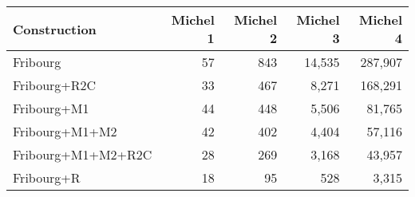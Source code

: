 \begin{tabular}{lrrrr}
  \hline
Construction & Michel 1 & Michel 2 & Michel 3 & Michel 4 \\ 
  \hline
Fribourg & 57 & 843 & 14,535 & 287,907 \\ 
  Fribourg+R2C & 33 & 467 & 8,271 & 168,291 \\ 
  Fribourg+M1 & 44 & 448 & 5,506 & 81,765 \\ 
  Fribourg+M1+M2 & 42 & 402 & 4,404 & 57,116 \\ 
  Fribourg+M1+M2+R2C & 28 & 269 & 3,168 & 43,957 \\ 
  Fribourg+R & 18 & 95 & 528 & 3,315 \\ 
   \hline
\end{tabular}

